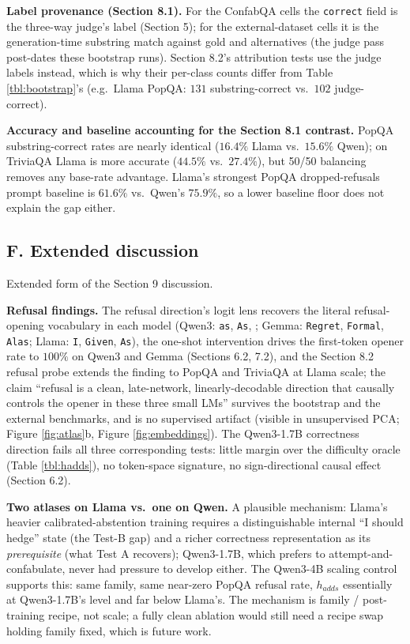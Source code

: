 \textbf{Label provenance (Section 8.1).} For the ConfabQA cells the
\texttt{correct} field is the three-way judge's label (Section 5); for
the external-dataset cells it is the generation-time substring match
against gold and alternatives (the judge pass post-dates these bootstrap
runs). Section 8.2's attribution tests use the judge labels instead,
which is why their per-class counts differ from Table
\ref{tbl:bootstrap}'s (e.g.~Llama PopQA: \(131\) substring-correct
vs.~\(102\) judge-correct).

\textbf{Accuracy and baseline accounting for the Section 8.1 contrast.}
PopQA substring-correct rates are nearly identical (\(16.4\%\) Llama
vs.~\(15.6\%\) Qwen); on TriviaQA Llama is more accurate (\(44.5\%\)
vs.~\(27.4\%\)), but 50/50 balancing removes any base-rate advantage.
Llama's strongest PopQA dropped-refusals prompt baseline is \(61.6\%\)
vs.~Qwen's \(75.9\%\), so a lower baseline floor does not explain the
gap either.

\subsection{F. Extended discussion}\label{f.-extended-discussion}

Extended form of the Section 9 discussion.

\textbf{Refusal findings.} The refusal direction's logit lens
recovers the literal refusal-opening vocabulary in each model (Qwen3:
\texttt{as}, \texttt{As}, \texttt{}; Gemma: \texttt{Regret},
\texttt{Formal}, \texttt{Alas}; Llama: \texttt{I}, \texttt{Given},
\texttt{As}), the one-shot intervention drives the first-token opener
rate to \(100\%\) on Qwen3 and Gemma (Sections 6.2, 7.2), and the
Section 8.2 refusal probe extends the finding to PopQA and TriviaQA at
Llama scale; the claim ``refusal is a clean, late-network,
linearly-decodable direction that causally controls the opener in these three small LMs'' survives the bootstrap and the external benchmarks, and is no
supervised artifact (visible in unsupervised PCA; Figure \ref{fig:atlas}b, Figure \ref{fig:embeddings}). The Qwen3-1.7B
correctness direction fails all three corresponding tests: little margin
over the difficulty oracle (Table \ref{tbl:hadds}), no token-space
signature, no sign-directional causal effect (Section 6.2).

\textbf{Two atlases on Llama vs.~one on Qwen.} A plausible mechanism:
Llama's heavier calibrated-abstention training requires a
distinguishable internal ``I should hedge'' state (the Test-B gap) and a
richer correctness representation as its \emph{prerequisite} (what Test
A recovers); Qwen3-1.7B, which prefers to attempt-and-confabulate, never
had pressure to develop either. The Qwen3-4B scaling control supports
this: same family, same near-zero PopQA refusal rate, \(h_{adds}\)
essentially at Qwen3-1.7B's level and far below Llama's. The mechanism
is family / post-training recipe, not scale; a fully clean ablation
would still need a recipe swap holding family fixed, which is future
work.

